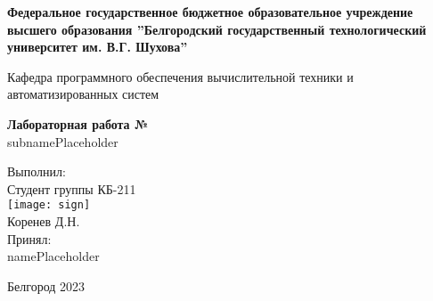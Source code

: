 \documentclass[12pt, a4paper]{report}
\def\workName{Лабораторная работа № }
\def\workSubname{subnamePlaceholder}
\def\myName{Коренев Д.Н.}
\def\myGroup{КБ-211}
\def\myTeacher{namePlaceholder}
\def\myCity{Белгород}
\def\year{2023}
\begin{document}
% 
% 
% 
\begin{center}
    \textbf{Федеральное государственное бюджетное образовательное учреждение
    высшего образования ''Белгородский государственный технологический
    университет им. В.Г. Шухова''}
\end{center}
% 
\vspace{0.1cm}
% 
\begin{center}
    Кафедра программного обеспечения вычислительной техники и
    автоматизированных систем
\end{center}
% 
\vspace{3cm}
% 
\begin{center}
    \textbf{\workName{}} \\
    \workSubname{}
\end{center}
% 
\vspace{4cm}
\begin{flushright}
    \begin{minipage}{0.5\textwidth}
        \begin{flushleft}
            Выполнил: \\
            Студент группы \myGroup{} \\
            \texttt{[image: sign]}\\
            \vspace*{-1.25cm}\underline{\hspace{3cm}} \myName{}\\
            \vspace{0.1cm}
            Принял: \\
            \vspace{1cm}
            \underline{\hspace{3cm}} \myTeacher{}
            
        \end{flushleft}
    \end{minipage}
\end{flushright}

\thispagestyle{empty} %
\begin{center}
    \vfill \myCity{} \year{} %
\end{center}

\newpage
% 
% 
\end{document}
